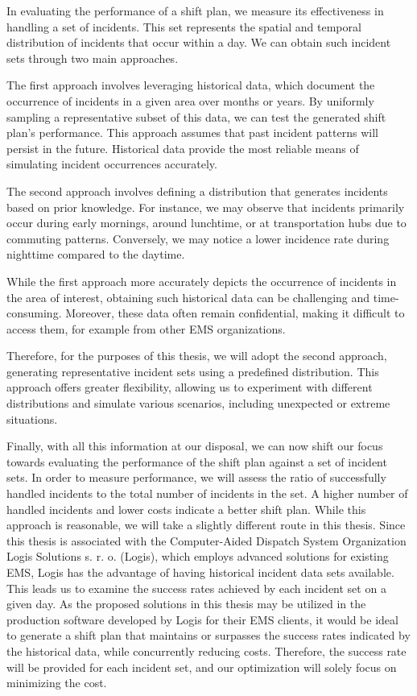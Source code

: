 In evaluating the performance of a shift plan, we measure its effectiveness in
handling a set of incidents. This set represents the spatial and temporal
distribution of incidents that occur within a day. We can obtain such incident
sets through two main approaches.

The first approach involves leveraging historical data, which document the
occurrence of incidents in a given area over months or years. By uniformly
sampling a representative subset of this data, we can test the generated shift
plan's performance. This approach assumes that past incident patterns will
persist in the future. Historical data provide the most reliable means of
simulating incident occurrences accurately.

The second approach involves defining a distribution that generates incidents
based on prior knowledge. For instance, we may observe that incidents primarily
occur during early mornings, around lunchtime, or at transportation hubs due to
commuting patterns. Conversely, we may notice a lower incidence rate during
nighttime compared to the daytime.

While the first approach more accurately depicts the occurrence of incidents in
the area of interest, obtaining such historical data can be challenging and
time-consuming. Moreover, these data often remain confidential, making it
difficult to access them, for example from other EMS organizations.

Therefore, for the purposes of this thesis, we will adopt the second approach,
generating representative incident sets using a predefined distribution. This
approach offers greater flexibility, allowing us to experiment with different
distributions and simulate various scenarios, including unexpected or extreme
situations.

Finally, with all this information at our disposal, we can now shift our focus
towards evaluating the performance of the shift plan against a set of incident
sets. In order to measure performance, we will assess the ratio of successfully
handled incidents to the total number of incidents in the set. A higher number
of handled incidents and lower costs indicate a better shift plan. While this
approach is reasonable, we will take a slightly different route in this thesis.
Since this thesis is associated with the Computer-Aided Dispatch System
Organization Logis Solutions s. r. o. (Logis), which employs advanced solutions
for existing EMS, Logis has the advantage of having historical incident data
sets available. This leads us to examine the success rates achieved by each
incident set on a given day. As the proposed solutions in this thesis may be
utilized in the production software developed by Logis for their EMS clients,
it would be ideal to generate a shift plan that maintains or surpasses the
success rates indicated by the historical data, while concurrently reducing
costs. Therefore, the success rate will be provided for each incident set, and
our optimization will solely focus on minimizing the cost.

